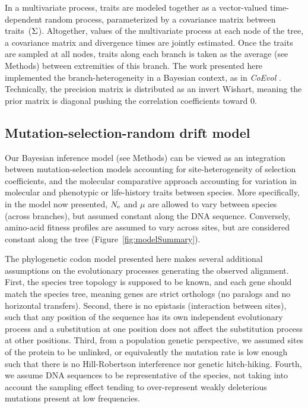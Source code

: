 In a multivariate process, traits are modeled together as a vector-valued time-dependent random process, parameterized by a covariance matrix between traits~($\Sigma$).
Altogether, values of the multivariate process at each node of the tree, a covariance matrix and divergence times are jointly estimated.
Once the traits are sampled at all nodes, traits along each branch is taken as the average (see Methods) between extremities of this branch.
The work presented here implemented the branch-heterogeneity in a Bayesian context, as in \textit{CoEvol} \citep{Lartillot2011}.
Technically, the precision matrix is distributed as an invert Wishart, meaning the prior matrix is diagonal pushing the correlation coefficients toward $0$.

\subsection{Mutation-selection-random drift model}
\label{sec:BranchSiteHetero}
Our Bayesian inference model (see Methods) can be viewed as an integration between mutation-selection models accounting for site-heterogeneity of selection coefficients, and the molecular comparative approach accounting for variation in molecular and phenotypic or life-history traits between species.
More specifically, in the model now presented, $N_{\mathrm{e}}$ and $\mu$ are allowed to vary between species (across branches), but assumed constant along the DNA sequence.
Conversely, amino-acid fitness profiles are assumed to vary across sites, but are considered constant along the tree (Figure~\ref{fig:modelSummary}).

The phylogenetic codon model presented here makes several additional assumptions on the evolutionary processes generating the observed alignment.
First, the species tree topology is supposed to be known, and each gene should match the species tree, meaning genes are strict orthologs (no paralogs and no horizontal transfers).
Second, there is no epistasis (interaction between sites), such that any position of the sequence has its own independent evolutionary process and a substitution at one position does not affect the substitution process at other positions.
Third, from a population genetic perspective, we assumed sites of the protein to be unlinked, or equivalently the mutation rate is low enough such that there is no Hill-Robertson interference nor genetic hitch-hiking.
Fourth, we assume DNA sequences to be representative of the species, not taking into account the sampling effect tending to over-represent weakly deleterious mutations present at low frequencies.


